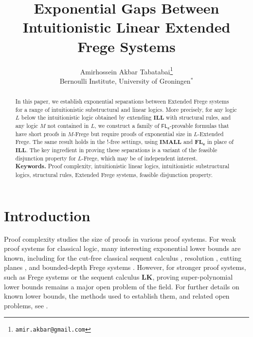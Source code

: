 \documentclass[12pt,a4paper]{article}
\theoremstyle{plain}
\theoremstyle{definition}
\begin{document}
\title{Exponential Gaps Between Intuitionistic Linear Extended Frege Systems}
\author{Amirhossein Akbar Tabatabai\footnote{\texttt{amir.akbar@gmail.com}}\\
\small{Bernoulli Institute, University of Groningen$^*$}
}
\date{}
\maketitle
\begin{abstract}
In this paper, we establish exponential separations between Extended Frege systems for a range of intuitionistic substructural and linear logics. More precisely, for any logic $L$ below the intuitionistic logic obtained by extending $\mathbf{ILL}$ with structural rules, and any logic $M$ not contained in $L$, we construct a family of $\mathsf{FL_e}$-provable formulas that have short proofs in $M$-Frege but require proofs of exponential size in $L$-Extended Frege. The same result holds in the $!$-free settings, using $\mathbf{IMALL}$ and $\mathbf{FL_e}$ in place of $\mathbf{ILL}$. The key ingredient in proving these separations is a variant of the feasible disjunction property for $L$-Frege, which may be of independent interest.\\

\noindent \textbf{Keywords.} Proof complexity, intuitionistic linear logics, intuitionistic substructural logics, structural rules, Extended Frege systems, feasible disjunction property.
\end{abstract}
\maketitle

\section{Introduction}

Proof complexity studies the size of proofs in various proof systems. For weak proof systems for classical logic, many interesting exponential lower bounds are known, including for the cut-free classical sequent calculus \cite{krajivcekfeasible2}, resolution \cite{Haken}, cutting planes \cite{Cutting2}, and bounded-depth Frege systems \cite{krajivcekFeasible}. However, for stronger proof systems, such as Frege systems or the sequent calculus $\mathbf{LK}$, proving super-polynomial lower bounds remains a major open problem of the field. For further details on known lower bounds, the methods used to establish them, and related open problems, see \cite{Krajicek}.
\end{document}
